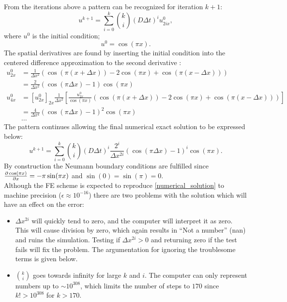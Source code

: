 \noindent From the iterations above a pattern can be recognized for iteration $k+1$:\\
\begin{equation}
 u^{k+1} = \sum\limits_{i=0}^k {k\choose i}\left(D\Delta t\right)^iu^0_{2ix},
\end{equation}
where $u^0$ is the initial condition;
\begin{equation}
 u^0 = \cos(\pi x).
\end{equation}
The spatial derivatives are found by inserting the initial condition into the centered difference approximation to the second derivative :
\begin{align*}
 u^0_{2x} &= \frac{1}{\Delta x^2}\left(\cos(\pi(x+\Delta x)) -2\cos(\pi x) +\cos(\pi(x-\Delta x))\right) \\
 &= \frac{2}{\Delta x^2}\left(\cos(\pi\Delta x)-1\right)\cos(\pi x)\\
 u^0_{4x} &= [u^0_{2x}]_{2x} \frac{1}{\Delta x^2}\left[\frac{u^0_{2x}}{\cos(\pi x)}\left(\cos(\pi(x+\Delta x)) -2\cos(\pi x) +\cos(\pi(x-\Delta x))\right)\right]\\
 &= \frac{4}{\Delta x^4}\left(\cos(\pi\Delta x)-1\right)^2\cos(\pi x)\\
 &\dots
\end{align*}
The pattern continues allowing the final numerical exact solution to be expressed below:
\begin{equation}\label{numerical_solution}
  u^{k+1} = \sum\limits_{i=0}^k {k\choose i}\left(D\Delta t\right)^i\frac{2^i}{\Delta x^{2i}}\left(\cos(\pi\Delta x)-1\right)^i\cos(\pi x).
\end{equation}
By construction the Neumann boundary conditions are fulfilled since $\frac{\partial \cos(\pi x)}{\partial x} = -\pi\sin(\pi x)$ and $\sin(0) = \sin(\pi) = 0$. \\

Although the FE scheme is expected to reproduce \eqref{numerical_solution} to machine precision ($\epsilon \approx 10^{-16}$) there are two problems with the solution which will have an effect on the error:
\begin{itemize}
 \item $\Delta x^{2i}$ will quickly tend to zero, and the computer will interpret it as zero. This will cause division by zero, which again results in ``Not a number'' (nan) and ruins the simulation. Testing if $\Delta x^{2i}>0$ and returning zero if the test fails will fix the problem. The argumentation for ignoring the troublesome terms is given below.
 \item ${k\choose i}$ goes towards infinity for large $k$ and $i$. The computer can only represent numbers up to $\sim10^{308}$, which limits the number of steps to $170$ since $k!>10^{308}$ for $k>170$.
\end{itemize}

